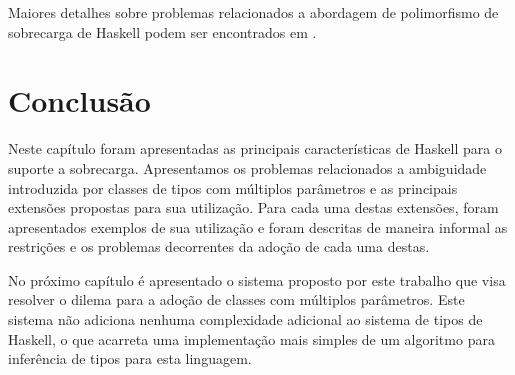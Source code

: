 Maiores detalhes sobre problemas relacionados a abordagem de polimorfismo de sobrecarga de 
Haskell podem ser encontrados em \cite{Camarao99}.

\section{Conclus\~ao}

Neste cap\'itulo foram apresentadas as principais caracter\'isticas de Haskell para o suporte a sobrecarga. 
Apresentamos os problemas relacionados a ambiguidade introduzida por classes de tipos com m\'ultiplos 
par\^ametros e as principais extens\~oes propostas para sua utiliza\c{c}\~ao. Para cada uma 
destas extens\~oes, foram apresentados exemplos de sua utiliza\c{c}\~ao e foram descritas de maneira informal 
as restri\c{c}\~oes e os problemas decorrentes da ado\c{c}\~ao de cada uma destas.

No pr\'oximo cap\'itulo \'e apresentado o sistema proposto por este trabalho que visa resolver o dilema para a 
ado\c{c}\~ao de classes com m\'ultiplos par\^ametros. Este sistema n\~ao adiciona nenhuma complexidade adicional
ao sistema de tipos de Haskell, o que acarreta uma implementa\c{c}\~ao mais simples de um algoritmo para 
infer\^encia de tipos para esta linguagem.   

